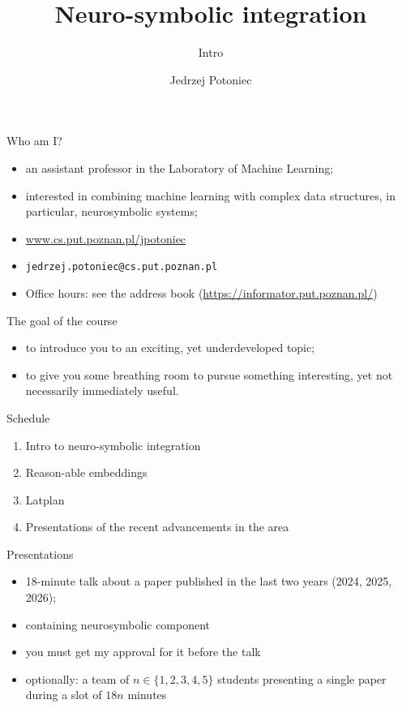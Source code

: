 \documentclass{lecture}
\title{Neuro-symbolic integration}
\subtitle{Intro}
\author{Jedrzej Potoniec}
\begin{document}
\frame{\titlepage}

\begin{frame}{Who am I?}
\begin{itemize}
\item an assistant professor in the Laboratory of Machine Learning;
\item interested in combining machine learning with complex data structures, in particular, neurosymbolic systems;
\item \url{www.cs.put.poznan.pl/jpotoniec}
\item \texttt{jedrzej.potoniec@cs.put.poznan.pl}
\item Office hours: see the address book (\url{https://informator.put.poznan.pl/})
\end{itemize}
\end{frame}

\begin{frame}{The goal of the course}
    \begin{itemize}
        \item to introduce you to an exciting, yet underdeveloped topic;
        \item to give you some breathing room to pursue something interesting, yet not necessarily immediately useful.
    \end{itemize}
\end{frame}

\begin{frame}{Schedule}
    \begin{enumerate}
        \item Intro to neuro-symbolic integration
        \item Reason-able embeddings
        \item Latplan        
        \item[4--7.5] Presentations of the recent advancements in the area
    \end{enumerate}
\end{frame}

\begin{frame}{Presentations}
    \begin{itemize}
        \item 18-minute talk about a paper published in the last two years (2024, 2025, 2026);
        \item containing neurosymbolic component
        \item you must get my approval for it \alert{before the talk}
        \item optionally: a team of $n\in\{1,2,3,4,5\}$ students presenting a single paper during a slot of $18n$ minutes        
    \end{itemize}
\end{frame}
\end{document}
